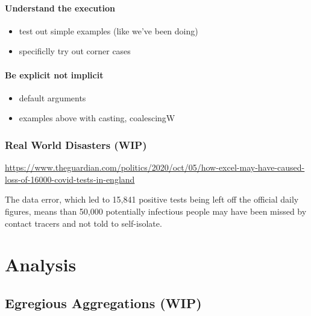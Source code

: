 \documentclass[
]{krantz}
\providecommand{\tightlist}{%
  \setlength{\itemsep}{0pt}\setlength{\parskip}{0pt}}
\renewenvironment{quote}{\begin{VF}}{\end{VF}}
\begin{document}
\hypertarget{understand-the-execution-1}{%
\subsection{Understand the execution}\label{understand-the-execution-1}}

\begin{itemize}
\tightlist
\item
  test out simple examples (like we've been doing)
\item
  specificlly try out corner cases
\end{itemize}

\hypertarget{be-explicit-not-implicit}{%
\subsection{Be explicit not implicit}\label{be-explicit-not-implicit}}

\begin{itemize}
\tightlist
\item
  default arguments
\item
  examples above with casting, coalescingW
\end{itemize}

\hypertarget{real-world-disasters-wip}{%
\section{Real World Disasters (WIP)}\label{real-world-disasters-wip}}

\url{https://www.theguardian.com/politics/2020/oct/05/how-excel-may-have-caused-loss-of-16000-covid-tests-in-england}

\begin{quote}
The data error, which led to 15,841 positive tests being left off the official daily figures, means than 50,000 potentially infectious people may have been missed by contact tracers and not told to self-isolate.
\end{quote}

\hypertarget{part-analysis}{%
\part*{Analysis}\label{part-analysis}}


\hypertarget{eg-agg}{%
\chapter{Egregious Aggregations (WIP)}\label{eg-agg}}
\end{document}

